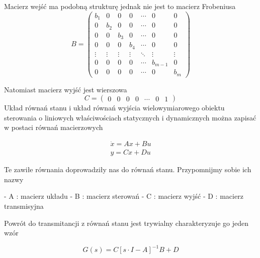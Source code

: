 \documentclass{article}
\begin{document}
		Macierz wejść ma podobną strukturę jednak nie jest to macierz Frobeniusa
		\begin{equation}
			B=\begin{pmatrix}
			  b_{1} &   0    &   0    &   0    & \cdots &   0      &   0    \\
			  0     &  b_{2} &   0    &   0    & \cdots &   0      &   0    \\
			  0     &   0    & b_{3}  &   0    & \cdots &   0      &   0    \\
			  0     &   0    &   0    &  b_{4} & \cdots &   0      &   0    \\
			\vdots  & \vdots & \vdots & \vdots & \ddots & \vdots   & \vdots \\
			  0     &   0    &   0    &   0    & \cdots &  b_{m-1} &   0    \\
			  0     &   0    &   0    &   0    & \cdots &   0      &   b_{m}
			\end{pmatrix}
		\end{equation}

		Natomiast macierz wyjść jest wierszowa
		\begin{equation}
			C=\begin{pmatrix}
			  0    &   0    &   0    &   0    & \cdots &   0      &   1
			\end{pmatrix}
		\end{equation}
		Układ równań stanu i układ równań wyjścia wielowymiarowego obiektu sterowania o
		liniowych właściwościach statycznych i dynamicznych można zapisać w postaci
		równań macierzowych

		\begin{equation}
			\begin{aligned}

				 \dot{x} = Ax + Bu \\
				 y       = Cx + Du 

			\end{aligned}
		\end{equation}

		Te zawiłe równania doprowadziły nas do równań stanu. Przypomnijmy sobie ich nazwy

		- A : macierz układu
		- B : macierz sterowań
		- C : macierz wyjść
		- D : macierz transmisyjna

		Powrót do transmitancji z równań stanu jest trywialny
		charakteryzuje go jeden wzór

		\begin{equation}
			G(s) = C[s \cdot I - A]^{-1}B + D
		\end{equation}
\end{document}
